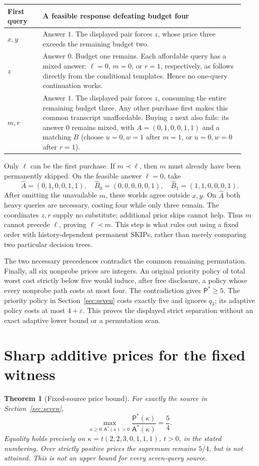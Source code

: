 \documentclass[pdflatex,sn-mathphys-num]{sn-jnl}
\newcommand{\A}{\mathsf{A}}
\newcommand{\Pcost}{\mathsf{P}}
\theoremstyle{thmstyleone}
\newtheorem{theorem}{Theorem}
\theoremstyle{thmstylethree}
\theoremstyle{thmstyletwo}
\begin{document}
\begin{center}\small
\begin{tabular}{@{}p{0.14\linewidth}p{0.80\linewidth}@{}}
\toprule
First query & A feasible response defeating budget four\\\midrule
$x,y$ & Answer $1$. The displayed pair forces $z$, whose price three
exceeds the remaining budget two.\\
$z$ & Answer $0$. Budget one remains. Each affordable query has a mixed
answer: $\ell=0$, $m=0$, or $r=1$, respectively, as follows directly
from the conditional templates. Hence no one-query continuation works.\\
$m,r$ & Answer $1$. The displayed pair forces $z$, consuming the entire
remaining budget three. Any other purchase first makes this common
transcript unaffordable. Buying $z$ next also fails: its answer $0$
remains mixed, with $A=(0,1,0,0,1,1)$ and a matching $B$ (choose
$u=0,w=1$ after $m=1$, or $u=0,w=0$ after $r=1$).\\
\bottomrule
\end{tabular}
\end{center}

Only $\ell$ can be the first purchase. If $m\prec\ell$, then $m$
must already have been permanently skipped. On the feasible answer
$\ell=0$, take
\[
 \widehat A=(0,1,0,0,1,1),\quad
 \widehat B_0=(0,0,0,0,0,1),\quad
 \widehat B_1=(1,1,0,0,0,1).
\]
After omitting the unavailable $m$, these worlds agree outside $x,y$.
On $\widehat A$ both heavy queries are necessary, costing four while
only three remain. The coordinates $z,r$ supply no substitute; additional
prior skips cannot help. Thus $m$ cannot precede $\ell$, proving
$\ell\prec m$. This step is what rules out using a fixed order with
history-dependent permanent SKIPs, rather than merely comparing two
particular decision trees.

The two necessary precedences contradict the common remaining
permutation. Finally, all six nonprobe prices are integers. An original
priority policy of total worst cost strictly below five would induce,
after free disclosure, a policy whose every nonprobe path costs at most
four. The contradiction gives $\Pcost^*\ge5$. The priority policy in
Section~\ref{sec:seven} costs exactly five and ignores $q_3$; its adaptive
policy costs at most $4+\varepsilon$. This proves the displayed strict
separation without an exact adaptive lower bound or a permutation scan.

\section{Sharp additive prices for the fixed witness}
\begin{theorem}[Fixed-source price bound]\label{thm:price}
For exactly the source in Section~\ref{sec:seven},
\[
 \max_{\kappa\geq0:\A^*(\kappa)>0}
 \frac{\Pcost^*(\kappa)}{\A^*(\kappa)}=\frac54.
\]
Equality holds precisely on $\kappa=t(2,2,3,0,1,1,1)$, $t>0$, in the stated numbering. Over strictly positive prices the supremum remains $5/4$, but is not attained. This is not an upper bound for every seven-query source.
\end{theorem}
\end{document}
